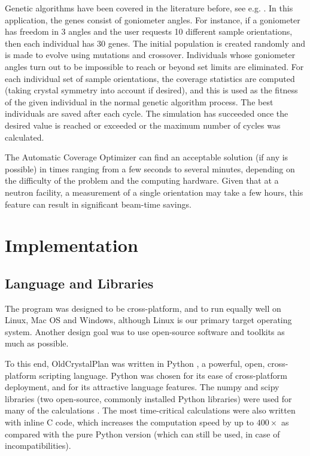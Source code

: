 \documentclass[final]{iucr}              %
\begin{document}
Genetic algorithms have been covered in the literature before, see e.g.
\cite{Goldberg89}. In this application, the genes
consist of goniometer angles. For instance, if a goniometer has freedom in 3 angles and the user
requests 10 different sample orientations, then each individual has 30 genes.
The initial population is created randomly and is made to evolve using mutations
and crossover. Individuals whose goniometer angles turn out to be impossible to
reach or beyond set limits are eliminated. For each individual set of sample
orientations, the coverage statistics are computed (taking crystal symmetry into
account if desired), and this is used as the fitness of the given individual in
the normal genetic algorithm process. The best individuals are saved after each
cycle. The simulation has succeeded once the desired value is reached or
exceeded or the maximum number of cycles was calculated.    

The Automatic Coverage Optimizer can find an acceptable solution (if any is
possible) in times ranging from a few seconds to several minutes, depending on
the difficulty of the problem and the computing hardware. Given that at a
neutron facility, a measurement of a single orientation may take a few
hours, this feature can result in significant beam-time savings.           




\section{Implementation}




\subsection{Language and Libraries}

The program was designed to be cross-platform, and to run equally well on Linux,
Mac OS and Windows, although Linux is our primary target operating system. Another
design goal was to use open-source software and toolkits as much as possible. 

To this end, OldCrystalPlan was written in Python \cite{python}, a powerful, open,
cross-platform scripting language. Python was chosen for its ease of cross-platform deployment, and for
its attractive language features. The numpy and scipy libraries (two
open-source, commonly installed Python libraries) were used for many of the
calculations \cite{numpy,scipy}. The most time-critical calculations
were also written with inline C code, which increases the computation speed by
up to $400\times$ as compared with the pure Python version (which can still be
used, in case of incompatibilities).
\end{document}
